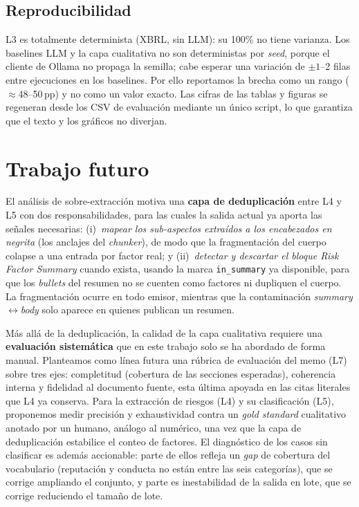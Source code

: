 \documentclass[conference]{IEEEtran}
\begin{document}
\subsection{Reproducibilidad}
L3 es totalmente determinista (XBRL, sin LLM): su 100\% no tiene varianza. Los
baselines LLM y la capa cualitativa no son deterministas por \textit{seed},
porque el cliente de Ollama no propaga la semilla; cabe esperar una variación de
$\pm1$--2 filas entre ejecuciones en los baselines. Por ello reportamos la
brecha como un rango ($\approx$48--50\,pp) y no como un valor exacto. Las cifras
de las tablas y figuras se regeneran desde los CSV de evaluación mediante un
único script, lo que garantiza que el texto y los gráficos no diverjan.

\section{Trabajo futuro}
\label{sec:future}
El análisis de sobre-extracción motiva una \textbf{capa de deduplicación} entre
L4 y L5 con dos responsabilidades, para las cuales la salida actual ya aporta las
señales necesarias: (i)~\emph{mapear los sub-aspectos extraídos a los encabezados
en negrita} (los anclajes del \textit{chunker}), de modo que la fragmentación del
cuerpo colapse a una entrada por factor real; y (ii)~\emph{detectar y descartar el
bloque \textit{Risk Factor Summary}} cuando exista, usando la marca
\texttt{in\_summary} ya disponible, para que los \textit{bullets} del resumen no
se cuenten como factores ni dupliquen el cuerpo. La fragmentación ocurre en todo
emisor, mientras que la contaminación \textit{summary}$\leftrightarrow$\textit{body}
solo aparece en quienes publican un resumen.

Más allá de la deduplicación, la calidad de la capa cualitativa requiere una
\textbf{evaluación sistemática} que en este trabajo solo se ha abordado de forma
manual. Planteamos como línea futura una rúbrica de evaluación del memo (L7) sobre
tres ejes: completitud (cobertura de las secciones esperadas), coherencia interna
y fidelidad al documento fuente, esta última apoyada en las citas literales que
L4 ya conserva. Para la extracción de riesgos (L4) y su clasificación (L5),
proponemos medir precisión y exhaustividad contra un \textit{gold standard}
cualitativo anotado por un humano, análogo al numérico, una vez que la capa de
deduplicación estabilice el conteo de factores. El diagnóstico de los casos sin
clasificar es además accionable: parte de ellos refleja un \emph{gap} de cobertura
del vocabulario (reputación y conducta no están entre las seis categorías), que se
corrige ampliando el conjunto, y parte es inestabilidad de la salida en lote, que
se corrige reduciendo el tamaño de lote.
\end{document}
